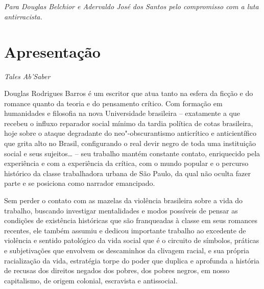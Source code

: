 \chapter*{}

\vfill
\begin{flushright}
\emph{Para Douglas Belchior e Adervaldo José dos Santos pelo compromisso
com a luta antirracista.}
\end{flushright}
\thispagestyle{empty}

\chapter*{Apresentação}

\begin{flushright}
\emph{Tales Ab'Saber}
\end{flushright}

Douglas Rodrigues Barros é um escritor que atua tanto na esfera da
ficção e do romance quanto da teoria e do pensamento crítico. Com
formação em humanidades e filosofia na nova Universidade brasileira --
exatamente a que recebeu o influxo reparador social mínimo da tardia
política de cotas brasileira, hoje sobre o ataque degradante do
neo"-obscurantismo anticrítico e anticientífico que grita alto no Brasil,
configurando o real devir negro de toda uma instituição social e seus
sujeitos\ldots{} -- seu trabalho mantém constante contato, enriquecido pela
experiência e com a experiência da crítica, com o mundo popular e o
percurso histórico da classe trabalhadora urbana de São Paulo, da qual
não oculta fazer parte e se posiciona como narrador emancipado.

Sem perder o contato com as mazelas da violência brasileira sobre a vida
do trabalho, buscando investigar mentalidades e modos possíveis de
pensar as condições de existência históricas que são franqueadas à
classe em seus romances recentes, ele também assumiu e dedicou
importante trabalho ao excedente de violência e sentido patológico da
vida social que é o circuito de símbolos, práticas e subjetivações que
envolvem os descaminhos da clivagem racial, e sua própria racialização
da vida, estratégia torpe do poder que duplica e aprofunda a história de
recusas dos direitos negados dos pobres, dos pobres negros, em nosso
capitalismo, de origem colonial, escravista e antissocial.

